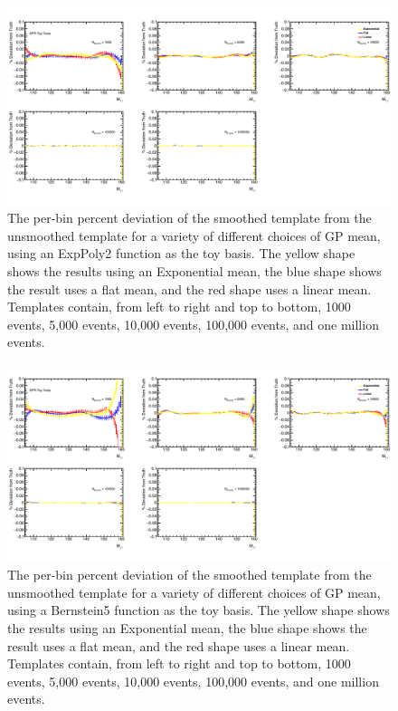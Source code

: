 \begin{figure} 
\begin{center}
  \includegraphics[width=\textwidth]{figures/background/gpr/checkBiasFromPriorChoice/Plots_GPR_PriorBiases_ExpPoly2_crop}   
   \caption{The per-bin percent deviation of the smoothed template from the unsmoothed template for a variety of different choices of GP mean, using an ExpPoly2 function as the toy basis. The yellow shape shows the results using an Exponential mean, the blue shape shows the result uses a flat mean, and the red shape uses a linear mean. Templates contain, from left to right and top to bottom, 1000 events, 5,000 events, 10,000 events, 100,000 events, and one million events.}
\label{fig:prior_bias_exppoly2}
\end{center}
\end{figure}

\begin{figure} 
\begin{center}
  \includegraphics[width=\textwidth]{figures/background/gpr/checkBiasFromPriorChoice/Plots_GPR_PriorBiases_Bern5_crop}   
   \caption{The per-bin percent deviation of the smoothed template from the unsmoothed template for a variety of different choices of GP mean, using a Bernstein5 function as the toy basis. The yellow shape shows the results using an Exponential mean, the blue shape shows the result uses a flat mean, and the red shape uses a linear mean. Templates contain, from left to right and top to bottom, 1000 events, 5,000 events, 10,000 events, 100,000 events, and one million events.}
\label{fig:prior_bias_bern5}
\end{center}
\end{figure}

